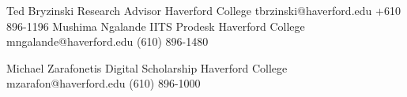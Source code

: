 %
%
%


\begin{referees}
		{Ted Bryzinski}
		{Research Advisor}
		{Haverford College}
		{tbrzinski@haverford.edu}
		{+610 896-1196}
		{Mushima Ngalande}
		{IITS Prodesk}
		{Haverford College}
		{mngalande@haverford.edu}
		{(610) 896-1480}

		{Michael Zarafonetis }
		{Digital Scholarship}
		{Haverford College}
		{mzarafon@haverford.edu}
		{(610) 896-1000}
	

\end{referees}